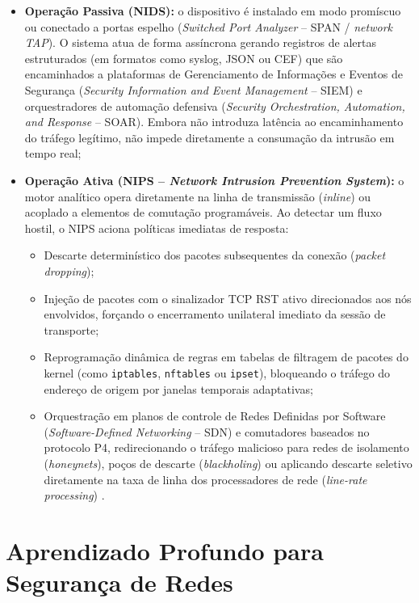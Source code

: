 \begin{itemize}
    \item \textbf{Operação Passiva (NIDS):} o dispositivo é instalado em modo promíscuo ou conectado a portas espelho (\emph{Switched Port Analyzer} -- SPAN / \emph{network TAP}). O sistema atua de forma assíncrona gerando registros de alertas estruturados (em formatos como syslog, JSON ou CEF) que são encaminhados a plataformas de Gerenciamento de Informações e Eventos de Segurança (\emph{Security Information and Event Management} -- SIEM) e orquestradores de automação defensiva (\emph{Security Orchestration, Automation, and Response} -- SOAR). Embora não introduza latência ao encaminhamento do tráfego legítimo, não impede diretamente a consumação da intrusão em tempo real;
    \item \textbf{Operação Ativa (NIPS -- \emph{Network Intrusion Prevention System}):} o motor analítico opera diretamente na linha de transmissão (\emph{inline}) ou acoplado a elementos de comutação programáveis. Ao detectar um fluxo hostil, o NIPS aciona políticas imediatas de resposta:
    \begin{itemize}
        \item Descarte determinístico dos pacotes subsequentes da conexão (\emph{packet dropping});
        \item Injeção de pacotes com o sinalizador TCP RST ativo direcionados aos nós envolvidos, forçando o encerramento unilateral imediato da sessão de transporte;
        \item Reprogramação dinâmica de regras em tabelas de filtragem de pacotes do kernel (como \texttt{iptables}, \texttt{nftables} ou \texttt{ipset}), bloqueando o tráfego do endereço de origem por janelas temporais adaptativas;
        \item Orquestração em planos de controle de Redes Definidas por Software (\emph{Software-Defined Networking} -- SDN) e comutadores baseados no protocolo P4, redirecionando o tráfego malicioso para redes de isolamento (\emph{honeynets}), poços de descarte (\emph{blackholing}) ou aplicando descarte seletivo diretamente na taxa de linha dos processadores de rede (\emph{line-rate processing}) \cite{p4nids2025}.
    \end{itemize}
\end{itemize}

\section{Aprendizado Profundo para Segurança de Redes}
\label{sec:deep_learning_seguranca}

